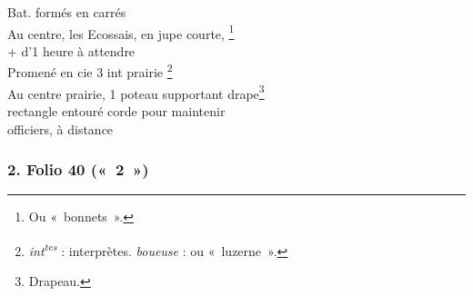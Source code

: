 \begin{LJlettre}
\quad Bat. formés en carrés\\
Au centre, les Ecossais, en jupe courte, \footnote{Ou «~bonnets~».}\\
+ d'1 heure à attendre\\
Promené en cie 3 int prairie \footnote{\textit{int\textsuperscript{tes}} : interprètes. \textit{boueuse} : ou «~luzerne~».}\\
Au centre prairie, 1 poteau supportant drape\footnote{Drapeau.}\\
rectangle entouré corde pour maintenir\\
officiers, à distance
\end{LJlettre}

\subsubsection*{2. Folio 40 («~2~»)}

